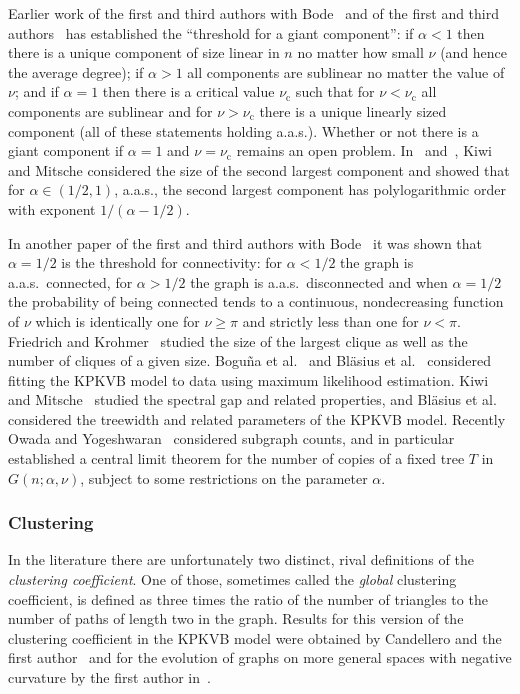Earlier work of the first and third authors with Bode~\cite{bode2015largest} and of the first and third authors~\cite{fountoulakis2018law} has 
established the ``threshold for a giant component'': if $\alpha < 1$ then there is a unique component of size linear in $n$ no matter how small 
$\nu$ (and hence the average degree); if $\alpha > 1$ all components are sublinear no matter the value of $\nu$; and if $\alpha=1$ then 
there is a critical value $\nu_{\text{c}}$ such that for $\nu < \nu_{\text{c}}$ all components are sublinear and for $\nu > \nu_{\text{c}}$ there 
is a unique linearly sized component (all of these statements holding a.a.s.). 
Whether or not there is a giant component if $\alpha=1$ and $\nu=\nu_{\text{c}}$ remains an open problem.
In~\cite{KiwiMit} and~\cite{KiwiMit2017+}, Kiwi and Mitsche considered the size of the second largest component and
showed that for $\alpha \in (1/2, 1)$, a.a.s., the second largest component has polylogarithmic order with exponent 
$1/(\alpha -1/2)$.


In another paper of the first and third authors with Bode~\cite{BFMconnRSA} it was shown that $\alpha=1/2$ is the threshold for connectivity:
for $\alpha < 1/2$ the graph is a.a.s.~connected, for $\alpha>1/2$ the graph is a.a.s.~disconnected and when $\alpha=1/2$ the probability 
of being connected tends to a continuous, nondecreasing function of $\nu$ which is identically one for $\nu \geq \pi$ and strictly less than one 
for $\nu < \pi$.
Friedrich and Krohmer~\cite{blasius2018cliques} studied the size of the largest clique as well as the number of cliques of a given size.
Bogu\~{n}a et al.~\cite{sustaining} and Bl\"asius et al.~\cite{BlasiusMLE} considered fitting the KPKVB model to data using maximum likelihood 
estimation.
Kiwi and Mitsche~\cite{KM18} studied the spectral gap and related properties, and Bl\"asius et al.~\cite{BlasiusTW} considered the treewidth 
and related parameters of the KPKVB model.
Recently Owada and Yogeshwaran~\cite{OY} considered subgraph counts, and in particular established a central limit theorem 
for the number of copies of a fixed tree $T$ in $G(n;\alpha,\nu)$, subject to some restrictions on the parameter $\alpha$.

\subsubsection*{Clustering}

In the literature there are unfortunately two distinct, rival definitions of the {\em clustering coefficient}.
One of those, sometimes called the {\em global} clustering coefficient, is defined as 
three times the ratio of the number of triangles to the number of paths of length two in the graph.
Results for this version of the clustering coefficient in the KPKVB model were obtained by Candellero and the first author~\cite{candellero2016clustering} and for the evolution of graphs on more general spaces with negative curvature by the first author in~\cite{F12}. 

